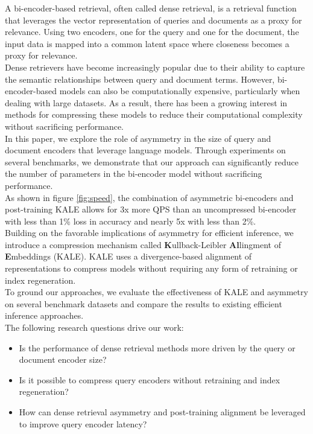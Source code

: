 A bi-encoder-based retrieval, often called dense retrieval, is a retrieval function that leverages the vector representation of queries and documents as a proxy for relevance. Using two encoders, one for the query and one for the document, the input data is mapped into a common latent space where closeness becomes a proxy for relevance. \\
Dense retrievers have become increasingly popular due to their ability to capture the semantic relationships between query and document terms. However, bi-encoder-based models can also be computationally expensive, particularly when dealing with large datasets. As a result, there has been a growing interest in methods for compressing these models to reduce their computational complexity without sacrificing performance.\\
In this paper, we explore the role of asymmetry in the size of query and document encoders that leverage language models. Through experiments on several benchmarks, we demonstrate that our approach can significantly reduce the number of parameters in the bi-encoder model without sacrificing performance. \\
As shown in figure \ref{fig:speed}, the combination of asymmetric bi-encoders and post-training KALE allows for 3x more QPS than an uncompressed bi-encoder with less than 1\% loss in accuracy and nearly 5x with less than 2\%.    \\
Building on the favorable implications of asymmetry for efficient inference, we introduce a compression mechanism called \textbf{K}ullback-Leibler \textbf{Al}lingment of \textbf{E}mbeddings (KALE). KALE uses a divergence-based alignment of representations to compress models without requiring any form of retraining or index regeneration. \\
To ground our approaches, we evaluate the effectiveness of KALE and asymmetry on several benchmark datasets and compare the results to existing efficient inference approaches. \\
The following research questions drive our work: 
\begin{itemize}
    \item Is the performance of dense retrieval methods more driven by the query or document encoder size?
    \item Is it possible to compress query encoders without retraining and index regeneration?
    \item How can dense retrieval asymmetry and post-training alignment be leveraged to improve query encoder latency?
\end{itemize}
